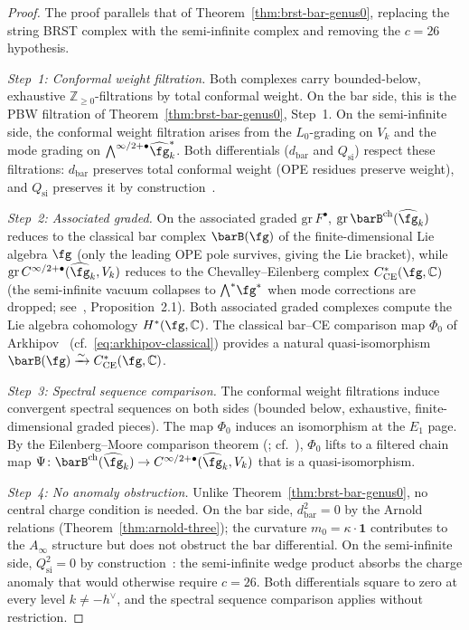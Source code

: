 \begin{proof}
The proof parallels that of
Theorem~\ref{thm:brst-bar-genus0}, replacing the string BRST
complex with the semi-infinite complex and removing the
$c = 26$ hypothesis.

\emph{Step~1: Conformal weight filtration.}
Both complexes carry bounded-below, exhaustive
$\mathbb{Z}_{\geq 0}$-filtrations by total conformal weight.
On the bar side, this is the PBW filtration of
Theorem~\ref{thm:brst-bar-genus0}, Step~1. On the semi-infinite
side, the conformal weight filtration arises from the
$L_0$-grading on $V_k$ and the mode grading on
$\bigwedge^{\infty/2+\bullet}\!\widehat{\fg}^*_k$. Both
differentials ($d_{\mathrm{bar}}$ and $Q_{\mathrm{si}}$) respect
these filtrations: $d_{\mathrm{bar}}$ preserves total conformal
weight (OPE residues preserve weight), and $Q_{\mathrm{si}}$
preserves it by construction~\cite{FGZ86}.

\emph{Step~2: Associated graded.}
On the associated graded $\mathrm{gr}\,F^\bullet$,
$\mathrm{gr}\,\barB^{\mathrm{ch}}(\widehat{\fg}_k)$ reduces
to the classical bar complex $\barB(\fg)$ of the
finite-dimensional Lie algebra $\fg$
(only the leading OPE pole survives, giving the Lie bracket),
while $\mathrm{gr}\,C^{\infty/2+\bullet}(\widehat{\fg}_k, V_k)$
reduces to the Chevalley--Eilenberg complex
$C^*_{\mathrm{CE}}(\fg, \mathbb{C})$
(the semi-infinite vacuum collapses to $\bigwedge^*\!\fg^*$
when mode corrections are dropped;
see~\cite{FGZ86}, Proposition~2.1).
Both associated graded complexes compute the Lie algebra cohomology
$H^*(\fg, \mathbb{C})$. The classical bar--CE comparison map
$\Phi_0$ of Arkhipov~\cite{Arkhipov97}
(cf.\ \eqref{eq:arkhipov-classical}) provides a natural
quasi-isomorphism $\barB(\fg) \xrightarrow{\sim}
C^*_{\mathrm{CE}}(\fg, \mathbb{C})$.

\emph{Step~3: Spectral sequence comparison.}
The conformal weight filtrations induce convergent spectral sequences
on both sides (bounded below, exhaustive, finite-dimensional
graded pieces). The map $\Phi_0$ induces an isomorphism at the
$E_1$ page. By the Eilenberg--Moore comparison theorem
(\cite{EM66}; cf.\ \cite[Theorem~5.2.12]{Weibel94}), $\Phi_0$ lifts
to a filtered chain map
$\Psi \colon \barB^{\mathrm{ch}}(\widehat{\fg}_k) \to
C^{\infty/2+\bullet}(\widehat{\fg}_k, V_k)$
that is a quasi-isomorphism.

\emph{Step~4: No anomaly obstruction.}
Unlike Theorem~\ref{thm:brst-bar-genus0}, no central charge
condition is needed. On the bar side, $d_{\mathrm{bar}}^2 = 0$
by the Arnold relations
(Theorem~\ref{thm:arnold-three}); the curvature
$m_0 = \kappa \cdot \mathbf{1}$ contributes to the $A_\infty$
structure but does not obstruct the bar differential. On the
semi-infinite side, $Q_{\mathrm{si}}^2 = 0$ by
construction~\cite{FGZ86}: the semi-infinite wedge product
absorbs the charge anomaly that would otherwise require
$c = 26$. Both differentials square to zero at every level
$k \neq -h^\vee$, and the spectral sequence comparison
applies without restriction.


\end{proof}
